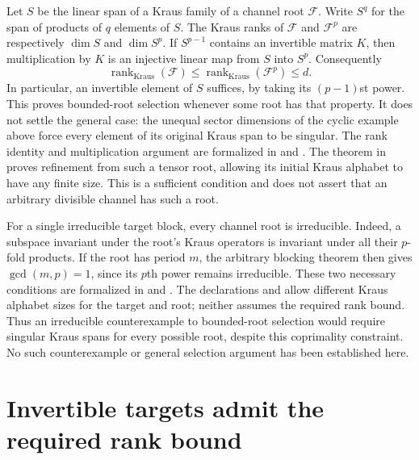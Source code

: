 \documentclass{article}
\begin{document}
Let $S$ be the linear span of a Kraus family of a channel root $\mathcal F$.
Write $S^q$ for the span of products of $q$ elements of $S$.
The Kraus ranks of $\mathcal F$ and $\mathcal F^p$ are respectively
$\dim S$ and $\dim S^p$. If $S^{p-1}$ contains an invertible matrix $K$,
then multiplication by $K$ is an injective linear map from $S$ into $S^p$.
Consequently
\[
  \operatorname{rank}_{\mathrm{Kraus}}(\mathcal F)
  \leq \operatorname{rank}_{\mathrm{Kraus}}(\mathcal F^p)
  \leq d.
\]
In particular, an invertible element of $S$ suffices, by taking its
$(p-1)$st power. This proves bounded-root selection whenever some root has
that property. It does not settle the general case: the unequal sector
dimensions of the cyclic example above force every element of its original
Kraus span to be singular. The rank identity and multiplication argument are formalized in
 and
. The theorem
in 
proves refinement from such a tensor root, allowing its initial Kraus
alphabet to have any finite size. This is a sufficient condition and does
not assert that an arbitrary divisible channel has such a root.

For a single irreducible target block, every channel root is irreducible.
Indeed, a subspace invariant under the root's Kraus operators is invariant
under all their $p$-fold products. If the root has period $m$, the arbitrary
blocking theorem then gives $\gcd(m,p)=1$, since its $p$th power remains
irreducible. These two necessary conditions are formalized in
 and
. The declarations
 and
allow different Kraus alphabet sizes for the target and root; neither
assumes the required rank bound. Thus an irreducible counterexample to bounded-root selection
would require singular Kraus spans for every possible root, despite this
coprimality constraint. No such counterexample or general selection argument
has been established here.

\section{Invertible targets admit the required rank bound}
\end{document}
